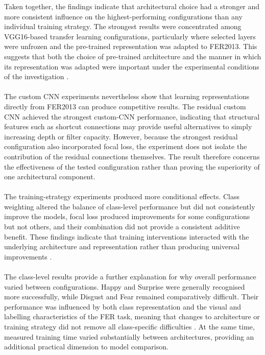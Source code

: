 \documentclass[12pt, a4paper]{report}
\begin{document}
			Taken together, the findings indicate that architectural choice had a stronger and more consistent influence on the highest-performing configurations than any individual training strategy. The strongest results were concentrated among VGG16-based transfer learning configurations, particularly where selected layers were unfrozen and the pre-trained representation was adapted to FER2013. This suggests that both the choice of pre-trained architecture and the manner in which its representation was adapted were important under the experimental conditions of the investigation \cite{Pan2010TransferLearning, Georgiou2026FERReview}.\\\\
			The custom CNN experiments nevertheless show that learning representations directly from FER2013 can produce competitive results. The residual custom CNN achieved the strongest custom-CNN performance, indicating that structural features such as shortcut connections may provide useful alternatives to simply increasing depth or filter capacity. However, because the strongest residual configuration also incorporated focal loss, the experiment does not isolate the contribution of the residual connections themselves. The result therefore concerns the effectiveness of the tested configuration rather than proving the superiority of one architectural component.\\\\
			The training-strategy experiments produced more conditional effects. Class weighting altered the balance of class-level performance but did not consistently improve the models, focal loss produced improvements for some configurations but not others, and their combination did not provide a consistent additive benefit. These findings indicate that training interventions interacted with the underlying architecture and representation rather than producing universal improvements \cite{Johnson2019ClassImbalance, lin2017focal, Hunafa2026FERImbalance}.\\\\
			The class-level results provide a further explanation for why overall performance varied between configurations. Happy and Surprise were generally recognised more successfully, while Disgust and Fear remained comparatively difficult. Their performance was influenced by both class representation and the visual and labelling characteristics of the FER task, meaning that changes to architecture or training strategy did not remove all class-specific difficulties \cite{Pham2023InterIntraFER, Barsoum2016FERPlus}. At the same time, measured training time varied substantially between architectures, providing an additional practical dimension to model comparison.\\\\
\end{document}
